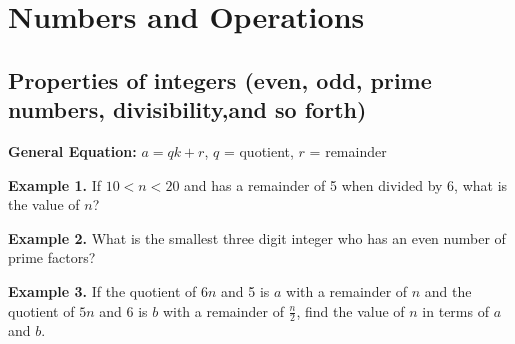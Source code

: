 \chapter{Numbers and Operations}



\section{Properties of integers (even, odd, prime numbers, divisibility,and so forth)}

\bigskip
\begin{inparaenum}
\textbf{General Equation:} $a = qk+r$, $q$ = quotient, $r$ = remainder

\vfill
\textbf{Example 1.} If $10<n<20$ and has a remainder of 5 when divided by 6, what is the value of $n$?

\vfill
\textbf{Example 2.} What is the smallest three digit integer who has an even number of prime factors?

\vfill
\textbf{Example 3.} If the quotient of $6n$ and 5 is $a$ with a remainder of $n$ and the quotient of $5n$ and 6 is $b$ with a remainder of $\frac{n}{2}$, find the value of $n$ in terms of $a$ and $b$.
\end{inparaenum}

\vfill
\newpage
\setlength{\columnseprule}{1pt}


